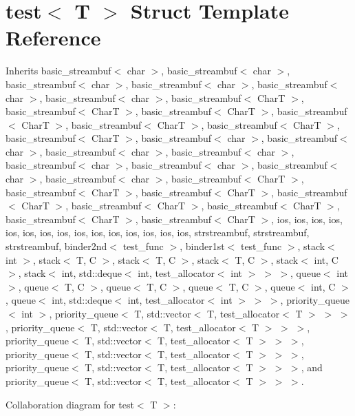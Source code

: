 \hypertarget{structtest}{}\section{test$<$ T $>$ Struct Template Reference}
\label{structtest}


Inherits basic\+\_\+streambuf$<$ char $>$, basic\+\_\+streambuf$<$ char $>$, basic\+\_\+streambuf$<$ char $>$, basic\+\_\+streambuf$<$ char $>$, basic\+\_\+streambuf$<$ char $>$, basic\+\_\+streambuf$<$ char $>$, basic\+\_\+streambuf$<$ Char\+T $>$, basic\+\_\+streambuf$<$ Char\+T $>$, basic\+\_\+streambuf$<$ Char\+T $>$, basic\+\_\+streambuf$<$ Char\+T $>$, basic\+\_\+streambuf$<$ Char\+T $>$, basic\+\_\+streambuf$<$ Char\+T $>$, basic\+\_\+streambuf$<$ Char\+T $>$, basic\+\_\+streambuf$<$ char $>$, basic\+\_\+streambuf$<$ char $>$, basic\+\_\+streambuf$<$ char $>$, basic\+\_\+streambuf$<$ char $>$, basic\+\_\+streambuf$<$ char $>$, basic\+\_\+streambuf$<$ char $>$, basic\+\_\+streambuf$<$ char $>$, basic\+\_\+streambuf$<$ char $>$, basic\+\_\+streambuf$<$ Char\+T $>$, basic\+\_\+streambuf$<$ Char\+T $>$, basic\+\_\+streambuf$<$ Char\+T $>$, basic\+\_\+streambuf$<$ Char\+T $>$, basic\+\_\+streambuf$<$ Char\+T $>$, basic\+\_\+streambuf$<$ Char\+T $>$, basic\+\_\+streambuf$<$ Char\+T $>$, basic\+\_\+streambuf$<$ Char\+T $>$, ios, ios, ios, ios, ios, ios, ios, ios, ios, ios, ios, ios, ios, ios, ios, strstreambuf, strstreambuf, strstreambuf, binder2nd$<$ test\+\_\+func $>$, binder1st$<$ test\+\_\+func $>$, stack$<$ int $>$, stack$<$ T, C $>$, stack$<$ T, C $>$, stack$<$ T, C $>$, stack$<$ int, C $>$, stack$<$ int, std\+::deque$<$ int, test\+\_\+allocator$<$ int $>$ $>$ $>$, queue$<$ int $>$, queue$<$ T, C $>$, queue$<$ T, C $>$, queue$<$ T, C $>$, queue$<$ int, C $>$, queue$<$ int, std\+::deque$<$ int, test\+\_\+allocator$<$ int $>$ $>$ $>$, priority\+\_\+queue$<$ int $>$, priority\+\_\+queue$<$ T, std\+::vector$<$ T, test\+\_\+allocator$<$ T $>$ $>$ $>$, priority\+\_\+queue$<$ T, std\+::vector$<$ T, test\+\_\+allocator$<$ T $>$ $>$ $>$, priority\+\_\+queue$<$ T, std\+::vector$<$ T, test\+\_\+allocator$<$ T $>$ $>$ $>$, priority\+\_\+queue$<$ T, std\+::vector$<$ T, test\+\_\+allocator$<$ T $>$ $>$ $>$, priority\+\_\+queue$<$ T, std\+::vector$<$ T, test\+\_\+allocator$<$ T $>$ $>$ $>$, and priority\+\_\+queue$<$ T, std\+::vector$<$ T, test\+\_\+allocator$<$ T $>$ $>$ $>$.



Collaboration diagram for test$<$ T $>$\+:
